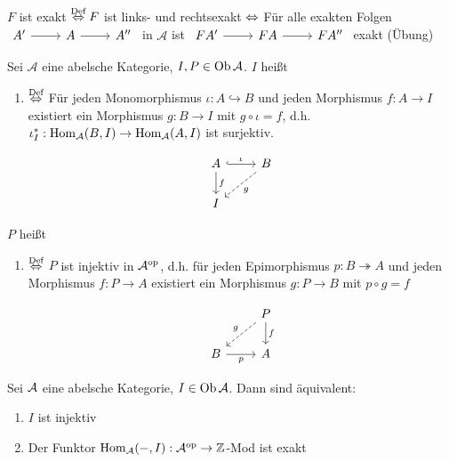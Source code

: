 \begin{anm}
	$F$ ist exakt $\overset{\text{Def}}{\Leftrightarrow} F$ ist links- und rechtsexakt $\Leftrightarrow$ Für alle exakten Folgen $\begin{tikzcd}
	A' \arrow{r} & A \arrow{r} & A''
	\end{tikzcd}$ in $\mathcal{A}$ ist $\begin{tikzcd}
	FA' \arrow{r} & FA \arrow{r} & FA''
	\end{tikzcd}$ exakt (Übung)
\end{anm}
\begin{df}\label{5.28}
	Sei $\mathcal{A}$ eine abelsche Kategorie, $I,P \in \text{Ob}\,\mathcal{A}$. $I$ heißt
	\begin{enumerate}
		\item[] 
		 \begin{minipage}[t]{0.7\textwidth}
		 $\overset{\text{Def}}{\Leftrightarrow}$ Für jeden Monomorphismus $\iota: A \hookrightarrow B$ und jeden Morphismus $f: A \to I$ existiert ein Morphismus $g:B \to I$ mit $g\circ \iota = f$, d.h. $\iota_I^*: \operatorname{Hom}_{\mathcal{A}}(B,I) \to \operatorname{Hom}_{\mathcal{A}}(A,I)$ ist surjektiv.	
		\end{minipage}
		\begin{minipage}[t]{0.3\textwidth} 
			$$\begin{tikzcd}
			A \arrow[hook]{r}{\iota} \arrow{d}{f} & B\arrow[dashed]{dl}{g} \\
			I & 
			\end{tikzcd}$$
		\end{minipage}
	\end{enumerate}
	$P$ heißt
	\begin{enumerate}

	\item[] \begin{minipage}[t]{0.7\textwidth}
		 $\overset{\text{Def}}{\Leftrightarrow}$ $P$ ist injektiv in $\mathcal{A}^\text{op}$, d.h. für jeden Epimorphismus $p: B\twoheadrightarrow A$ und jeden Morphismus $f:P \to A$ existiert ein Morphismus $g:P \to B$ mit $p \circ g = f$
	\end{minipage}
	\begin{minipage}[t]{0.3\textwidth} 
		$$\begin{tikzcd}
		& P\arrow[dashed, swap]{dl}{g} \arrow{d}{f} \\
		B \arrow[swap]{r}{p} & A
		\end{tikzcd}$$
	\end{minipage}
	\end{enumerate}
\end{df}
\begin{bem}\label{5.29}
	Sei $\mathcal{A}$ eine abelsche Kategorie, $I\in \text{Ob}\,\mathcal{A}$. Dann sind äquivalent:
	\begin{enumerate}[label= \roman*)]
		\item $I$ ist injektiv
		\item Der Funktor $\operatorname{Hom}_{\mathcal{A}}(-, I): \mathcal{A}^\text{op} \to \mathbb{Z}$-Mod ist exakt
	\end{enumerate}
\end{bem}

